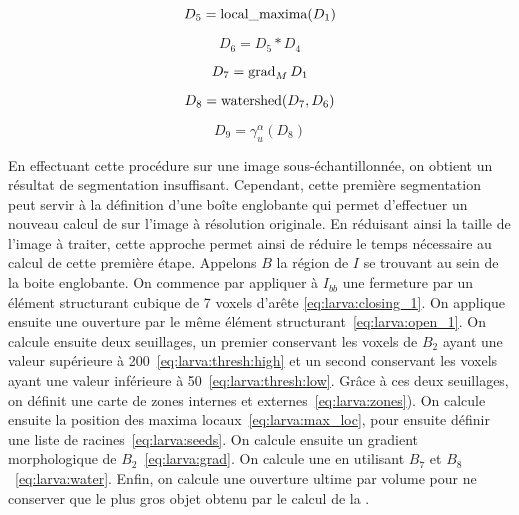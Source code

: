 \documentclass[\main/main.tex]{subfiles}
\begin{document}
\begin{equation}
    \label{eq:larva:down:max_loc}
    D_{5} = \operatorname{\textnormal{local\_maxima}}(D_1) \\
\end{equation}

\begin{equation}
    \label{eq:larva:down:seeds}
    D_{6}= D_{5} * D_{4}
\end{equation}

\begin{equation}
    \label{eq:larva:down:grad}
    D_{7}= \operatorname{\textnormal{grad}}_M{D_1}
\end{equation}

\begin{equation}
    \label{eq:larva:down:water}
    D_{8}= \operatorname{\textnormal{watershed}}(D_{7},D_{6})
\end{equation}

\begin{equation}
    \label{eq:larva:down:water}
    D_{9}= \gamma^{\alpha}_{u}(D_8)
\end{equation}

En effectuant cette procédure sur une image sous-échantillonnée, on obtient un résultat de segmentation insuffisant.
%
Cependant, cette première segmentation peut servir à la définition d'une boîte englobante qui permet d'effectuer un nouveau calcul de \watershed{} sur l'image à résolution originale.
%
En réduisant ainsi la taille de l'image à traiter, cette approche permet ainsi de réduire le temps nécessaire au calcul de cette première étape.
%
Appelons $B$ la région de $I$ se trouvant au sein de la boite englobante.
%
On commence par appliquer à $I_{bb}$ une fermeture par un élément structurant cubique de 7 voxels d'arête \eqref{eq:larva:closing_1}.
%
On applique ensuite une ouverture par le même élément structurant~\eqref{eq:larva:open_1}.
%
On calcule ensuite deux seuillages, un premier conservant les voxels de $B_2$ ayant une valeur supérieure à 200~\eqref{eq:larva:thresh:high} et un second conservant les voxels ayant une valeur inférieure à 50~\eqref{eq:larva:thresh:low}.
%
Grâce à ces deux seuillages, on définit une carte de zones internes et externes~\eqref{eq:larva:zones}).
%
On calcule ensuite la position des maxima locaux~\eqref{eq:larva:max_loc}, pour ensuite définir une liste de racines~\eqref{eq:larva:seeds}.
%
On calcule ensuite un gradient morphologique de $B_2$~\eqref{eq:larva:grad}.
%
On calcule une \watershed{} en utilisant $B_7$ et $B_8$~\eqref{eq:larva:water}.
%
Enfin, on calcule une ouverture ultime par volume pour ne conserver que le plus gros objet obtenu par le calcul de la \watershed{}.
\end{document}
